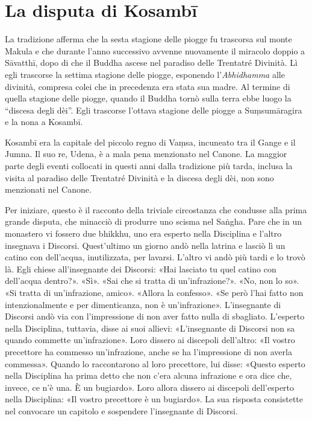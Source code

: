 \chapter{La disputa di Kosambī}

  La tradizione afferma che la sesta stagione delle
piogge fu trascorsa sul monte Makula e che durante l’anno successivo
avvenne nuovamente il miracolo doppio a Sāvatthī, dopo di che il Buddha
ascese nel paradiso delle Trentatré Divinità. Lì egli trascorse la
settima stagione delle piogge, esponendo l’\emph{Abhidhamma} alle divinità,
compresa colei che in precedenza era stata sua madre. Al termine di
quella stagione delle piogge, quando il Buddha tornò sulla terra ebbe
luogo la “discesa degli dèi”. Egli trascorse l’ottava stagione delle
piogge a Suṃsumāragira e la nona a Kosambī.


 Kosambī era la capitale del piccolo regno di Vaṃsa,
incuneato tra il Gange e il Jumna. Il suo re, Udena, è a mala pena
menzionato nel Canone. La maggior parte degli eventi collocati in questi
anni dalla tradizione più tarda, inclusa la visita al paradiso delle
Trentatré Divinità e la discesa degli dèi, non sono menzionati nel
Canone.


 Per iniziare, questo è il racconto della triviale
circostanza che condusse alla prima grande disputa, che minacciò di
produrre uno scisma nel Saṅgha. Pare che in un monastero vi fossero due
bhikkhu, uno era esperto nella Disciplina e l’altro insegnava i
Discorsi. Quest’ultimo un giorno andò nella latrina e lasciò lì un
catino con dell’acqua, inutilizzata, per lavarsi. L’altro vi andò più
tardi e lo trovò là. Egli chiese all’insegnante dei Discorsi: «Hai
lasciato tu quel catino con dell’acqua dentro?». «Sì». «Sai che si
tratta di un’infrazione?». «No, non lo so». «Si tratta di un’infrazione,
amico». «Allora la confesso». «Se però l’hai fatto non intenzionalmente
e per dimenticanza, non è un’infrazione». L’insegnante di Discorsi andò
via con l’impressione di non aver fatto nulla di sbagliato. L’esperto
nella Disciplina, tuttavia, disse ai suoi allievi: «L’insegnante di
Discorsi non sa quando commette un’infrazione». Loro dissero ai
discepoli dell’altro: «Il vostro precettore ha commesso un’infrazione,
anche se ha l’impressione di non averla commessa». Quando lo
raccontarono al loro precettore, lui disse: «Questo esperto nella
Disciplina ha prima detto che non c’era alcuna infrazione e ora dice
che, invece, ce n’è una. È un bugiardo». Loro allora dissero ai
discepoli dell’esperto nella Disciplina: «Il vostro precettore è un
bugiardo». La sua risposta consistette nel convocare un capitolo e
sospendere l’insegnante di Discorsi.



